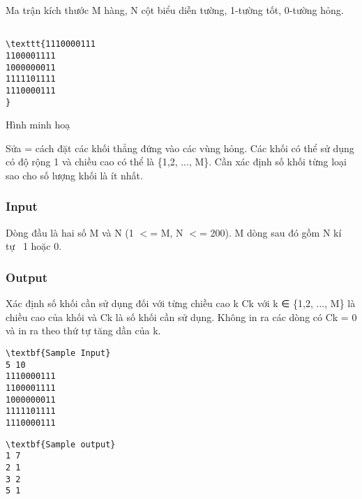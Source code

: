 

Ma trận kích thước M hàng, N cột biểu diễn tường, 1-tường tốt, 0-tường hỏng. 
\begin{verbatim}

\texttt{1110000111
1100001111
1000000011
1111101111
1110000111 
}\end{verbatim}

Hình minh hoạ

Sửa = cách đặt các khối thẳng đứng vào các vùng hỏng. Các khối có thể sử dụng có độ rộng 1 và chiều cao có thể là \{1,2, ..., M\}. Cần xác định số khối từng loại sao cho số lượng khối là ít nhất.

\subsubsection{Input}Dòng đầu là hai số M và N (1 $<$= M, N $<$= 200). M dòng sau đó gồm N kí tự  1 hoặc 0. 

\subsubsection{Output}Xác định số khối cần sử dụng đối với từng chiều cao k Ck với k ∈ \{1,2, ..., M\} là chiều cao của khối và Ck là số khối cần sử dụng. Không in ra các dòng có Ck = 0 và in ra theo thứ tự tăng dần của k.
\begin{verbatim}
\textbf{Sample Input}
5 10 
1110000111
1100001111
1000000011
1111101111
1110000111\end{verbatim}
\begin{verbatim}
\textbf{Sample output}
1 7 
2 1 
3 2 
5 1 
\end{verbatim}